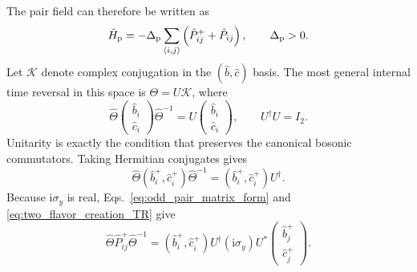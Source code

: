 \documentclass[onecolumn,aps,prb,amsmath,amssymb,superscriptaddress,longbibliography]{revtex4-2}
\newcommand{\ii}{\mathrm{i}}
\newcommand{\mc}[1]{\mathcal{#1}}
\begin{document}
The pair field can therefore be written as
\begin{equation}
    \hat H_{\rm p}
    =-\Delta_{\rm p}\sum_{\langle i,j\rangle}
    \left(\hat P_{ij}^++\hat P_{ij}\right),
    \qquad \Delta_{\rm p}>0.
    \label{eq:real_odd_pair_field}
\end{equation}
Let \(\mc K\) denote complex conjugation in the \((\hat b,\hat c)\) basis.  The most general internal time reversal in this space is \(\Theta=U\mc K\), where
\begin{equation}
    \widehat\Theta
    \begin{pmatrix}\hat b_i\\ \hat c_i\end{pmatrix}
    \widehat\Theta^{-1}
    =U\begin{pmatrix}\hat b_i\\ \hat c_i\end{pmatrix},
    \qquad U^\dagger U=I_2.
    \label{eq:two_flavor_general_TR}
\end{equation}
Unitarity is exactly the condition that preserves the canonical bosonic commutators.  Taking Hermitian conjugates gives
\begin{equation}
    \widehat\Theta(\hat b_i^+,\hat c_i^+)\widehat\Theta^{-1}
    =(\hat b_i^+,\hat c_i^+)U^\dagger.
    \label{eq:two_flavor_creation_TR}
\end{equation}
Because \(\ii\sigma_y\) is real, Eqs.~\eqref{eq:odd_pair_matrix_form} and \eqref{eq:two_flavor_creation_TR} give
\begin{equation}
    \widehat\Theta\hat P_{ij}^+\widehat\Theta^{-1}
    =
    (\hat b_i^+,\hat c_i^+)
    U^\dagger(\ii\sigma_y)U^*
    \begin{pmatrix}\hat b_j^+\\ \hat c_j^+\end{pmatrix}.
    \label{eq:odd_pair_TR_before_determinant}
\end{equation}
\end{document}
